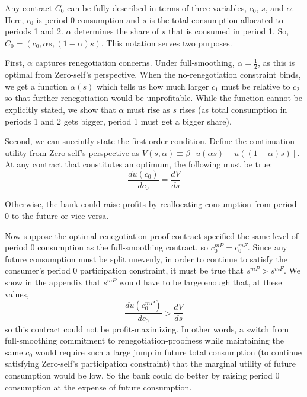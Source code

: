 \documentclass[11pt,english]{article}
\theoremstyle{plain}
\theoremstyle{definition}
\begin{document}
Any contract $C_{0}$ can be fully described in terms of three variables,
$c_{0}$, $s$, and $\alpha$. Here, $c_{0}$ is period 0 consumption
and $s$ is the total consumption allocated to periods 1 and 2. $\alpha$
determines the share of $s$ that is consumed in period 1. So, $C_{0}=\left(c_{0},\alpha s,\left(1-\alpha\right)s\right)$.
This notation serves two purposes.

First, $\alpha$ captures renegotiation concerns. Under full-smoothing,
$\alpha=\frac{1}{2}$, as this is optimal from Zero-self's perspective.
When the no-renegotiation constraint binds, we get a function $\alpha\left(s\right)$
which tells us how much larger $c_{1}$ must be relative to $c_{2}$
so that further renegotiation would be unprofitable. While the function
cannot be explicitly stated, we show that $\alpha$ must rise as $s$
rises (as total consumption in periods 1 and 2 gets bigger, period
1 must get a bigger share).

Second, we can succintly state the first-order condition. 
Define the continuation utility from Zero-self's perspective as 
$V\left(s,\alpha\right)\equiv 
\beta\left[u\left(\alpha s\right)+u\left(\left(1-\alpha\right)s\right)\right]$.
At any contract that constitutes an optimum, the following must be true:
\begin{equation}
\frac{du\left(c_{0}\right)}{dc_{0}}=\frac{dV}{ds}\label{eq:foc-newnotation}
\end{equation}

Otherwise, the bank could raise profits by reallocating consumption
from period 0 to the future or vice versa.

Now suppose the optimal renegotiation-proof contract specified the
same level of period 0 consumption as the full-smoothing contract,
so $c_{0}^{mP}=c_{0}^{mF}$. Since any future consumption must be
split unevenly, in order to continue to satisfy the consumer's period
0 participation constraint, it must be true that $s^{mP}>$$s^{mF}$.
We show in the appendix that $s^{mP}$ would have to be large enough
that, at these values,
\begin{equation}
\frac{du\left(c_{0}^{mP}\right)}{dc_{0}}>\frac{dV}{ds}
\end{equation}
so this contract could not be profit-maximizing. In other words, a
switch from full-smoothing commitment to renegotiation-proofness while
maintaining the same $c_{0}$ would require such a large jump in future
total consumption (to continue satisfying Zero-self's participation
constraint) that the marginal utility of future consumption would
be low. So the bank could do better by raising period 0 consumption
at the expense of future consumption. 
\end{document}
